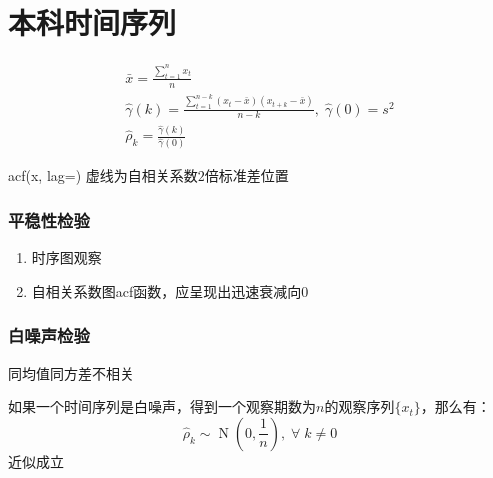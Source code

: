 \section{本科时间序列}


\begin{gather*}
	\bar{x}=\frac{\sum\limits_{t=1}^{n}x_t}{n} \\
	\hat{\gamma}(k)=\frac{\sum_{t=1}^{n-k}(x_t-\bar{x})(x_{t+k}-\bar{x})}{n-k},\;
	\hat{\gamma}(0)=s^2 \\
	\hat{\rho}_k=\frac{\hat{\gamma}(k)}{\hat{\gamma}(0)}
\end{gather*}

acf(x, lag=)
虚线为自相关系数$2$倍标准差位置

\subsubsection{平稳性检验}
\begin{enumerate}
	\item 时序图观察
	\item 自相关系数图acf函数，应呈现出迅速衰减向$0$
\end{enumerate}

\subsubsection{白噪声检验}
同均值同方差不相关
\begin{theorem}\label{theo:Barlett}
	如果一个时间序列是白噪声，得到一个观察期数为$n$的观察序列$\{x_t\}$，那么有：
	\begin{equation*}
		\hat{\rho}_k\sim\operatorname{N}\left(0,\frac{1}{n}\right),\;\forall\;k\ne0
	\end{equation*}
	近似成立
\end{theorem}

